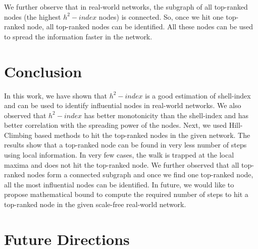 \documentclass[12pt,3p]{article}
\begin{document}
We further observe that in real-world networks, the subgraph of all top-ranked nodes (the highest $h^2-index$ nodes) is connected. So, once we hit one top-ranked node, all top-ranked nodes can be identified. All these nodes can be used to spread the information faster in the network.

\section{Conclusion}\label{conclusion}

In this work, we have shown that $h^2-index$ is a good estimation of shell-index and can be used to identify influential nodes in real-world networks. 
We also observed that $h^2-index$ has better monotonicity than the shell-index and has better correlation with the spreading power of the nodes.
Next, we used Hill-Climbing based methods to hit the top-ranked nodes in the given network. The results show that a top-ranked node can be found in very less number of steps using local information. In very few cases, the walk is trapped at the local maxima and does not hit the top-ranked node. We further observed that all top-ranked nodes form a connected subgraph and once we find one top-ranked node, all the most influential nodes can be identified. In future, we would like to propose mathematical bound to compute the required number of steps to hit a top-ranked node in the given scale-free real-world network.

\section{Future Directions}

%
\end{document}
